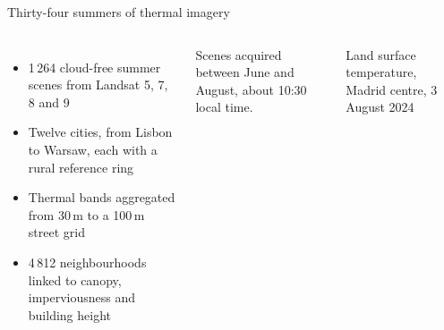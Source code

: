 \documentclass[aspectratio=169,10pt]{beamer}
\begin{document}
\begin{frame}{Thirty-four summers of thermal imagery}
  \begin{columns}[T,onlytextwidth]
      \begin{itemize}
        \item 1\,264 cloud-free summer scenes from Landsat 5, 7, 8 and 9
        \item Twelve cities, from Lisbon to Warsaw, each with a rural reference ring
        \item Thermal bands aggregated from 30\,m to a 100\,m street grid
        \item 4\,812 neighbourhoods linked to canopy, imperviousness and building height
      \end{itemize}
      \vspace{3mm}
      {\footnotesize\color{lsMuted}Scenes acquired between June and August, about 10:30 local time.\par}
      \centering
      \par
      \vspace{2mm}
      {\scriptsize\color{lsMuted}Land surface temperature, Madrid centre, 3 August 2024\par}
  \end{columns}
\end{frame}
\end{document}
